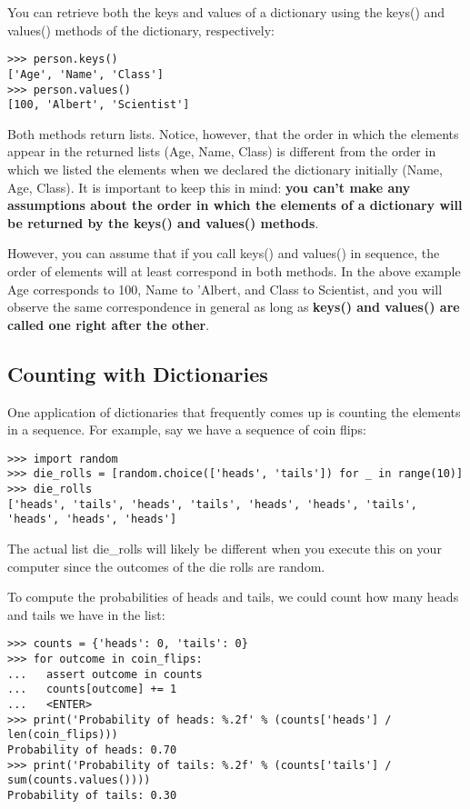 You can retrieve both the keys and values of a dictionary using the
keys() and values() methods of the dictionary, respectively:

\begin{verbatim}
>>> person.keys()
['Age', 'Name', 'Class']
>>> person.values()
[100, 'Albert', 'Scientist']
\end{verbatim}

Both methods return lists. Notice, however, that the order in which the
elements appear in the returned lists (Age, Name, Class) is different
from the order in which we listed the elements when we declared the
dictionary initially (Name, Age, Class). It is important to keep this in
mind: \textbf{you can't make any assumptions about the order in which
the elements of a dictionary will be returned by the keys() and values()
methods}.

However, you can assume that if you call keys() and values() in
sequence, the order of elements will at least correspond in both
methods. In the above example Age corresponds to 100, Name to 'Albert,
and Class to Scientist, and you will observe the same correspondence in
general as long as \textbf{keys() and values() are called one right
after the other}.

\subsection{Counting with
Dictionaries}\label{counting-with-dictionaries}

One application of dictionaries that frequently comes up is counting the
elements in a sequence. For example, say we have a sequence of coin
flips:

\begin{verbatim}
>>> import random
>>> die_rolls = [random.choice(['heads', 'tails']) for _ in range(10)]
>>> die_rolls
['heads', 'tails', 'heads', 'tails', 'heads', 'heads', 'tails', 'heads', 'heads', 'heads']
\end{verbatim}

The actual list die\_rolls will likely be different when you execute
this on your computer since the outcomes of the die rolls are random.

To compute the probabilities of heads and tails, we could count how many
heads and tails we have in the list:

\begin{verbatim}
>>> counts = {'heads': 0, 'tails': 0}
>>> for outcome in coin_flips:
...   assert outcome in counts
...   counts[outcome] += 1
...   <ENTER>
>>> print('Probability of heads: %.2f' % (counts['heads'] / len(coin_flips)))
Probability of heads: 0.70
>>> print('Probability of tails: %.2f' % (counts['tails'] / sum(counts.values())))
Probability of tails: 0.30
\end{verbatim}

